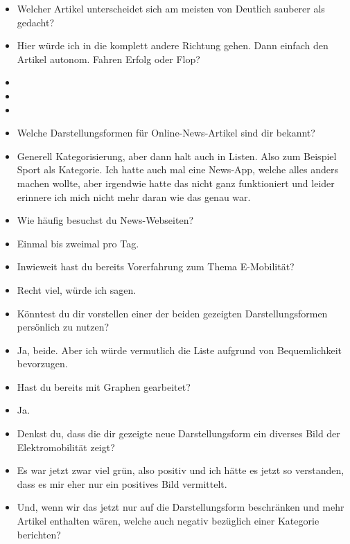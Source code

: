{\begin{itemize}[]
                  Also von mir aus einfach \flqq Rohstoffe für E-Auto Akku\frqq{}.
            \item {} Welcher Artikel unterscheidet sich am meisten von \flqq Deutlich sauberer als gedacht\frqq{}?
            \item {} Hier würde ich in die komplett andere Richtung gehen.
                  Dann einfach den Artikel \flqq autonom. Fahren Erfolg oder Flop?\frqq{}
            \item {}
            \item {}
            \item {}
            \item {} Welche Darstellungsformen für Online-News-Artikel sind dir bekannt?
            \item {} Generell Kategorisierung, aber dann halt auch in Listen. Also zum Beispiel Sport als Kategorie.
                  Ich hatte auch mal eine News-App, welche alles anders machen wollte, aber irgendwie hatte das nicht ganz funktioniert und leider erinnere ich mich nicht mehr daran wie das genau war.
            \item {} Wie häufig besuchst du News-Webseiten?
            \item {} Einmal bis zweimal pro Tag.
            \item {} Inwieweit hast du bereits Vorerfahrung zum Thema E-Mobilität?
            \item {} Recht viel, würde ich sagen.
            \item {} Könntest du dir vorstellen einer der beiden gezeigten Darstellungsformen persönlich zu nutzen?
            \item {} Ja, beide. Aber ich würde vermutlich die Liste aufgrund von Bequemlichkeit bevorzugen.
            \item {} Hast du bereits mit Graphen gearbeitet?
            \item {} Ja.
            \item {} Denkst du, dass die dir gezeigte neue Darstellungsform ein diverses Bild der Elektromobilität zeigt?
            \item {} Es war jetzt zwar viel grün, also positiv und ich hätte es jetzt so verstanden, dass es mir eher nur ein positives Bild vermittelt.
            \item {} Und, wenn wir das jetzt nur auf die Darstellungsform beschränken und mehr Artikel enthalten wären, welche auch negativ bezüglich einer Kategorie berichten?

\end{itemize}}
